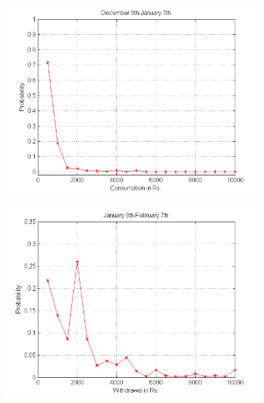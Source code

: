 \documentclass[12pt]{article}
\begin{document}
\begin{figure}
	\centering
	\includegraphics[scale=0.65]{CDEC.png}
	\caption{}
	\label{fig:fig6}
\end{figure}
\begin{figure}
	\centering
	\includegraphics[scale=0.65]{WJAN.png}
	\caption{}
	\label{fig:fig7}
\end{figure}
\end{document}
